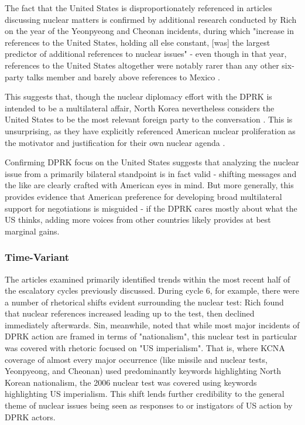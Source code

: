 \documentclass{article}
\begin{document}
The fact that the United States is disproportionately referenced in articles discussing nuclear matters is confirmed by additional research conducted by Rich on the year of the Yeonpyeong and Cheonan incidents, during which "increase in references to the United States, holding all else constant, [was] the largest predictor of additional references to nuclear issues" - even though in that year, references to the United States altogether were notably rarer than any other six-party talks member and barely above references to Mexico \cite{rich12}.

This suggests that, though the nuclear diplomacy effort with the DPRK is intended to be a multilateral affair, North Korea nevertheless considers the United States to be the most relevant foreign party to the conversation \cite{rich14}. This is unsurprising, as they have explicitly referenced American nuclear proliferation as the motivator and justification for their own nuclear agenda \cite{kcna, kcna3, kcna4}.

Confirming DPRK focus on the United States suggests that analyzing the nuclear issue from a primarily bilateral standpoint is in fact valid - shifting messages and the like are clearly crafted with American eyes in mind. But more generally, this provides evidence that American preference for developing broad multilateral support for negotiations is misguided - if the DPRK cares mostly about what the US thinks, adding more voices from other countries likely provides at best marginal gains.

\subsubsection{Time-Variant}

The articles examined primarily identified trends within the most recent half of the escalatory cycles previously discussed. During cycle 6, for example, there were a number of rhetorical shifts evident surrounding the nuclear test: Rich found that nuclear references increased leading up to the test, then declined immediately afterwards\cite{rich14}. Sin, meanwhile, noted that while most major incidents of DPRK action are framed in terms of "nationalism", this nuclear test in particular was covered with rhetoric focused on "US imperialism"\cite{sin}. That is, where KCNA coverage of almost every major occurrence (like missile and nuclear tests, Yeonpyeong, and Cheonan) used predominantly keywords highlighting North Korean nationalism, the 2006 nuclear test was covered using keywords highlighting US imperialism. This shift lends further credibility to the general theme of nuclear issues being seen as responses to or instigators of US action by DPRK actors.
\end{document}
